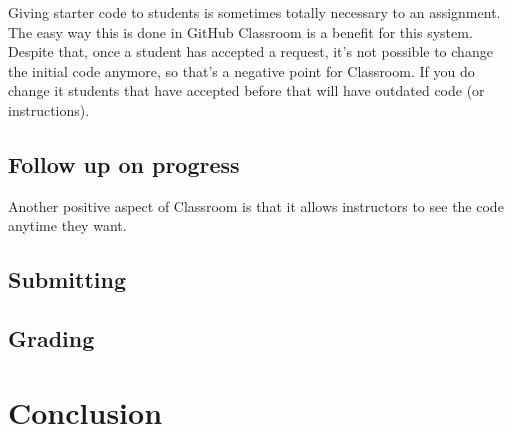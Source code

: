 \documentclass[12pt]{article}
\begin{document}
Giving starter code to students is sometimes totally necessary to an assignment. The easy way this is done in GitHub Classroom is a benefit for this system. Despite that, once a student has accepted a request, it's not possible to change the initial code anymore, so that's a negative point for Classroom. If you do change it students that have accepted before that will have outdated code (or instructions).

\subsection{Follow up on progress}

Another positive aspect of Classroom is that it allows instructors to see the code anytime they want.

\subsection{Submitting}

\subsection{Grading}

\section{Conclusion}
\end{document}
